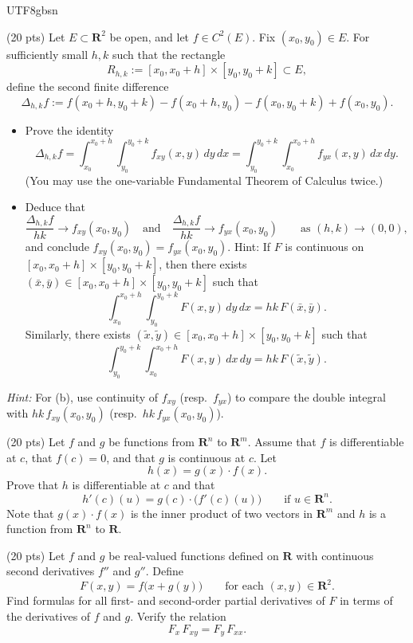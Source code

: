 \documentclass[addpoints]{exam}
\theoremstyle{definition}
\begin{document}
\begin{CJK*}{UTF8}{gbsn}
\begin{questions}
\question (20 pts) Let $E\subset\mathbf{R}^2$ be open, and let $f\in C^2(E)$.
Fix $(x_0,y_0)\in E$.  For sufficiently small $h,k$ such that the rectangle
\[
R_{h,k}:=[x_0,x_0+h]\times [y_0,y_0+k]\subset E,
\]
define the second finite difference
\[
\Delta_{h,k} f
:=
f(x_0+h,y_0+k)-f(x_0+h,y_0)-f(x_0,y_0+k)+f(x_0,y_0).
\]
\begin{itemize}
\item[(a)] Prove the identity
\[
\Delta_{h,k} f
=
\int_{x_0}^{x_0+h}\int_{y_0}^{y_0+k} f_{xy}(x,y)\,dy\,dx
=
\int_{y_0}^{y_0+k}\int_{x_0}^{x_0+h} f_{yx}(x,y)\,dx\,dy.
\]
(You may use the one-variable Fundamental Theorem of Calculus twice.)
\item[(b)] Deduce that
\[
\frac{\Delta_{h,k} f}{hk}\to f_{xy}(x_0,y_0)
\quad\text{and}\quad
\frac{\Delta_{h,k} f}{hk}\to f_{yx}(x_0,y_0)
\qquad\text{as }(h,k)\to(0,0),
\]
and conclude $f_{xy}(x_0,y_0)=f_{yx}(x_0,y_0)$. Hint:  If $F$ is continuous on $[x_0,x_0+h]\times [y_0,y_0+k]$, then there exists
$(\bar x,\bar y)\in [x_0,x_0+h]\times [y_0,y_0+k]$ such that
\[
\int_{x_0}^{x_0+h}\int_{y_0}^{y_0+k} F(x,y)\,dy\,dx
= hk\,F(\bar x,\bar y).
\]
Similarly, there exists $(\tilde x,\tilde y)\in [x_0,x_0+h]\times [y_0,y_0+k]$ such that
\[
\int_{y_0}^{y_0+k}\int_{x_0}^{x_0+h} F(x,y)\,dx\,dy
= hk\,F(\tilde x,\tilde y).
\]

\end{itemize}

\medskip
\noindent\emph{Hint:} For (b), use continuity of $f_{xy}$ (resp.\ $f_{yx}$) to compare the double integral with $hk\,f_{xy}(x_0,y_0)$ (resp.\ $hk\,f_{yx}(x_0,y_0)$).


\begin{solution} 
 
 \end{solution}

\question (20 pts) Let $f$ and $g$ be functions from $\mathbf{R}^n$ to $\mathbf{R}^m$. Assume that $f$ is
differentiable at $c$, that $f(c)=0$, and that $g$ is continuous at $c$.
Let
\[
h(x)=g(x)\cdot f(x).
\]
Prove that $h$ is differentiable at $c$ and that
\[
h'(c)(u)=g(c)\cdot\bigl(f'(c)(u)\bigr)
\qquad \text{if } u\in \mathbf{R}^n.
\] Note that $g(x)\cdot f(x)$ is the inner product of two vectors in $\mathbf{R}^m$ and $h$ is a function from
$\mathbf{R}^n$ to $\mathbf{R}$.


\begin{solution} 

\end{solution}

\question (20 pts) Let $f$ and $g$ be real-valued functions defined on $\mathbf{R}$ with continuous second
derivatives $f''$ and $g''$. Define
\[
F(x,y)=f\bigl(x+g(y)\bigr)
\qquad \text{for each }(x,y)\in \mathbf{R}^2.
\]
Find formulas for all first- and second-order partial derivatives of $F$ in terms of the
derivatives of $f$ and $g$. Verify the relation
\[
F_x\,F_{xy}=F_y\,F_{xx}.
\]


\end{questions}
\end{CJK*}
\end{document}

